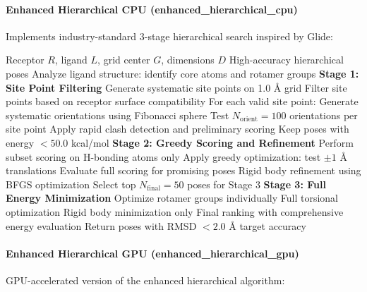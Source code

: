 \documentclass[11pt,a4paper]{article}
\begin{document}
\paragraph{Enhanced Hierarchical CPU (enhanced\_hierarchical\_cpu)}

Implements industry-standard 3-stage hierarchical search inspired by Glide:

\begin{algorithm}[H]
\caption{Enhanced Hierarchical CPU Docking (Glide-inspired)}
\begin{algorithmic}[1]
\Require Receptor $R$, ligand $L$, grid center $G$, dimensions $D$
\Ensure High-accuracy hierarchical poses
\State Analyze ligand structure: identify core atoms and rotamer groups
\State \textbf{Stage 1: Site Point Filtering}
\State Generate systematic site points on 1.0 Å grid
\State Filter site points based on receptor surface compatibility
\State For each valid site point:
\State \quad Generate systematic orientations using Fibonacci sphere
\State \quad Test $N_{\text{orient}} = 100$ orientations per site point
\State \quad Apply rapid clash detection and preliminary scoring
\State \quad Keep poses with energy $< 50.0$ kcal/mol
\State \textbf{Stage 2: Greedy Scoring and Refinement}
\State Perform subset scoring on H-bonding atoms only
\State Apply greedy optimization: test $\pm 1$ Å translations
\State Evaluate full scoring for promising poses
\State Rigid body refinement using BFGS optimization
\State Select top $N_{\text{final}} = 50$ poses for Stage 3
\State \textbf{Stage 3: Full Energy Minimization}
    \State Optimize rotamer groups individually
    \State Full torsional optimization
\Else
    \State Rigid body minimization only
\EndIf
\State Final ranking with comprehensive energy evaluation
\State Return poses with RMSD $< 2.0$ Å target accuracy
\end{algorithmic}
\end{algorithm}

\paragraph{Enhanced Hierarchical GPU (enhanced\_hierarchical\_gpu)}

GPU-accelerated version of the enhanced hierarchical algorithm:
\end{document}
